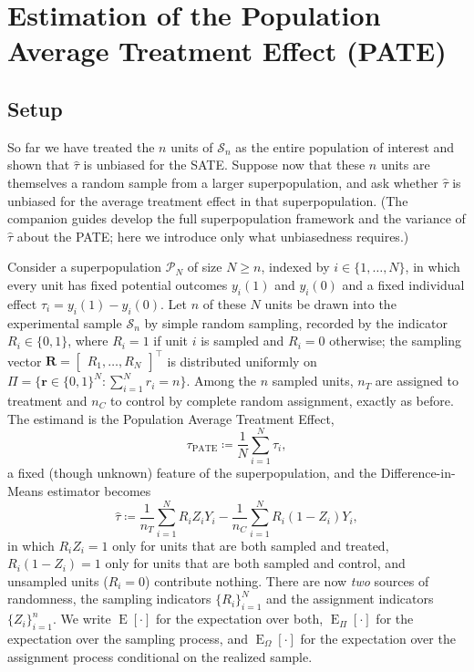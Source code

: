 \documentclass[12pt,leqno]{article}
\theoremstyle{newstyle}
\DeclareMathOperator{\E}{\mathrm{E}}
\DeclareMathOperator{\Var}{\mathrm{Var}}
\newcommand{\bZ}{\bm{Z}}   \newcommand{\bz}{\bm{z}}   %
\newcommand{\bR}{\bm{R}}   \newcommand{\br}{\bm{r}}   %
\newcommand{\EZ}{\E_{\Omega}}    \newcommand{\VarZ}{\Var_{\Omega}}  %
\newcommand{\ER}{\E_{\Pi}}       \newcommand{\VarR}{\Var_{\Pi}}     %
\newcommand{\po}[2]{y_{#1}(#2)}     %
\newcommand{\tauP}{\tau_{\text{PATE}}}
\newcommand{\tauhat}{\hat{\tau}}
\begin{document}
\section{Estimation of the Population Average Treatment Effect (PATE)}

\subsection{Setup}

So far we have treated the $n$ units of $\mathcal{S}_n$ as the entire population of interest and shown that $\tauhat$ is unbiased for the SATE. Suppose now that these $n$ units are themselves a random sample from a larger superpopulation, and ask whether $\tauhat$ is unbiased for the average treatment effect in that superpopulation. (The companion guides develop the full superpopulation framework and the variance of $\tauhat$ about the PATE; here we introduce only what unbiasedness requires.)

Consider a superpopulation $\mathcal{P}_N$ of size $N \geq n$, indexed by $i \in \{1, \ldots, N\}$, in which every unit has fixed potential outcomes $\po{i}{1}$ and $\po{i}{0}$ and a fixed individual effect $\tau_i = \po{i}{1} - \po{i}{0}$. Let $n$ of these $N$ units be drawn into the experimental sample $\mathcal{S}_n$ by simple random sampling, recorded by the indicator $R_i \in \{0, 1\}$, where $R_i = 1$ if unit $i$ is sampled and $R_i = 0$ otherwise; the sampling vector $\bR = \begin{bmatrix} R_1, \dots, R_N \end{bmatrix}^\top$ is distributed uniformly on $\Pi = \{\br \in \{0, 1\}^N : \sum_{i = 1}^N r_i = n\}$. Among the $n$ sampled units, $n_T$ are assigned to treatment and $n_C$ to control by complete random assignment, exactly as before. The estimand is the Population Average Treatment Effect,
\begin{equation*}
\tauP \coloneqq \dfrac{1}{N} \sum \limits_{i = 1}^N \tau_i,
\end{equation*}
a fixed (though unknown) feature of the superpopulation, and the Difference-in-Means estimator becomes
\begin{equation}
\label{eq: diff means est PATE unb}
\tauhat \coloneqq \dfrac{1}{n_T} \sum \limits_{i = 1}^N R_i Z_i Y_i - \dfrac{1}{n_C} \sum \limits_{i = 1}^N R_i \left(1 - Z_i\right) Y_i,
\end{equation}
in which $R_i Z_i = 1$ only for units that are both sampled and treated, $R_i(1 - Z_i) = 1$ only for units that are both sampled and control, and unsampled units ($R_i = 0$) contribute nothing. There are now \textit{two} sources of randomness, the sampling indicators $\{R_i\}_{i = 1}^N$ and the assignment indicators $\{Z_i\}_{i = 1}^n$. We write $\E[\cdot]$ for the expectation over both, $\ER[\cdot]$ for the expectation over the sampling process, and $\EZ[\cdot]$ for the expectation over the assignment process conditional on the realized sample.
\end{document}
